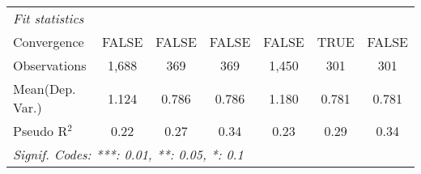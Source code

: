 \begin{tabular}{lcccccc}
   \midrule
   \emph{Fit statistics}\\
   Convergence             &FALSE   & FALSE   & FALSE           & FALSE  & TRUE   & FALSE\\  
   Observations            & 1,688  & 369     & 369             & 1,450  & 301    & 301\\  
Mean(Dep. Var.) & 1.124 & 0.786 & 0.786 & 1.180 & 0.781 & 0.781 \\
   Pseudo R$^2$            & 0.22   & 0.27    & 0.34            & 0.23   & 0.29   & 0.34\\  
   \midrule \midrule
   \multicolumn{7}{l}{\emph{Signif. Codes: ***: 0.01, **: 0.05, *: 0.1}}\\
\end{tabular}
\par\endgroup

